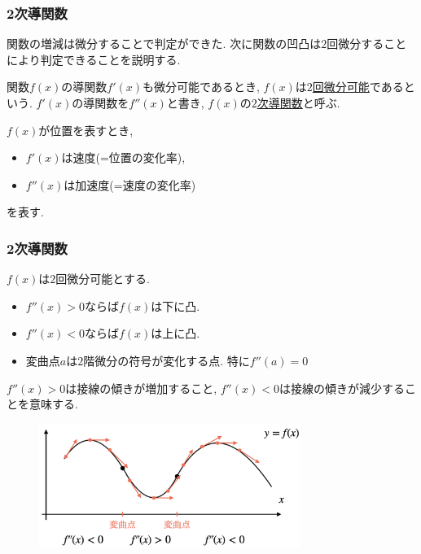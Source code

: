 


\begin{frame}
\frametitle{2次導関数}


関数の増減は微分することで判定ができた. 
次に関数の凹凸は$2$回微分することにより判定できることを説明する. 

\begin{Def}
関数$f(x)$の導関数$f'(x)$も微分可能であるとき, $f(x)$は\underline{$2$回微分可能}であるという. 
$f'(x)$の導関数を$f''(x)$と書き, $f(x)$の\underline{$2$次導関数}と呼ぶ. 
\end{Def}

$f(x)$が位置を表すとき, 
\begin{itemize}
\item $f'(x)$は速度(=位置の変化率), 
\item $f''(x)$は加速度(=速度の変化率) 
\end{itemize}
を表す.
\end{frame}





\begin{frame}
\frametitle{2次導関数}
\vspace{-2mm}

\begin{Thm}
$f(x)$は$2$回微分可能とする. 
\begin{itemize}
\item $f''(x)>0$ならば$f(x)$は下に凸. 
\item $f''(x)<0$ならば$f(x)$は上に凸.
\item 変曲点$a$は$2$階微分の符号が変化する点. 特に$f''(a)=0$
\end{itemize}
\end{Thm}
$f''(x)>0$は接線の傾きが増加すること, $f''(x)<0$は接線の傾きが減少することを意味する. 

\vspace{-1mm}

 \begin{figure}[htbp]
 \begin{center} 
  \includegraphics[width=85mm]{calculus7/inflection2.png}
 \end{center}
\end{figure}

\end{frame}


